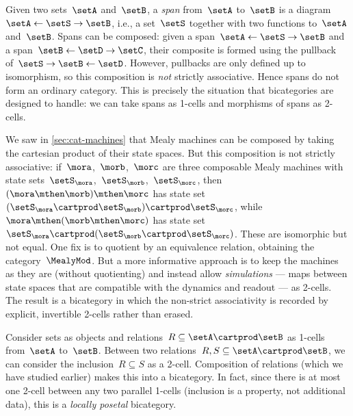 \begin{example}
    \label{exa:bicat-motivation-span}
    Given two sets~$\setA$ and~$\setB$, a \emph{span} from~$\setA$ to~$\setB$ is a diagram~$\setA \leftarrow \setS \rightarrow \setB$, i.e., a set~$\setS$ together with two functions to~$\setA$ and~$\setB$.
    Spans can be composed: given a span~$\setA \leftarrow \setS \rightarrow \setB$ and a span~$\setB \leftarrow \setD \rightarrow \setC$, their composite is formed using the pullback of~$\setS \rightarrow \setB \leftarrow \setD$.
    However, pullbacks are only defined up to isomorphism, so this composition is \emph{not} strictly associative.
    Hence spans do not form an ordinary category.
    This is precisely the situation that bicategories are designed to handle: we can take spans as 1-cells and morphisms of spans as 2-cells.
\end{example}

\begin{example}
    \label{exa:bicat-motivation-mealy}
    We saw in \cref{sec:cat-machines} that Mealy machines can be composed by taking the cartesian product of their state spaces.
    But this composition is not strictly associative: if~$\mora$,~$\morb$,~$\morc$ are three composable Mealy machines with state sets~$\setS_\mora$,~$\setS_\morb$,~$\setS_\morc$, then~$(\mora \mthen \morb) \mthen \morc$ has state set~$(\setS_\mora \cartprod \setS_\morb) \cartprod \setS_\morc$, while~$\mora \mthen (\morb \mthen \morc)$ has state set~$\setS_\mora \cartprod (\setS_\morb \cartprod \setS_\morc)$.
    These are isomorphic but not equal.
    One fix is to quotient by an equivalence relation, obtaining the category~$\MealyMod$.
    But a more informative approach is to keep the machines as they are (without quotienting) and instead allow \emph{simulations} --- maps between state spaces that are compatible with the dynamics and readout --- as 2-cells.
    The result is a bicategory in which the non-strict associativity is recorded by explicit, invertible 2-cells rather than erased.
\end{example}

\begin{example}[Relations]
    \label{exa:bicat-motivation-rel}
    Consider sets as objects and relations~$R \subseteq \setA \cartprod \setB$ as 1-cells from~$\setA$ to~$\setB$.
    Between two relations~$R, S \subseteq \setA \cartprod \setB$, we can consider the inclusion~$R \subseteq S$ as a 2-cell.
    Composition of relations (which we have studied earlier) makes this into a bicategory.
    In fact, since there is at most one 2-cell between any two parallel 1-cells (inclusion is a property, not additional data), this is a \emph{locally posetal} bicategory.
\end{example}

